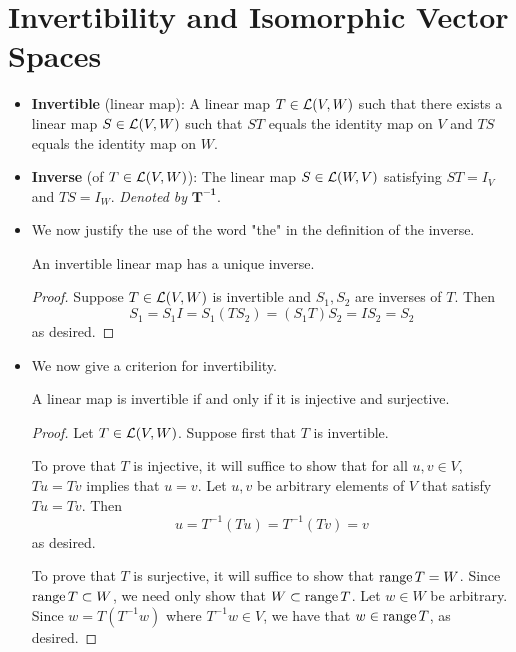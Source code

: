 \documentclass[../main.tex]{subfiles}
\begin{document}
\section{Invertibility and Isomorphic Vector Spaces}
\begin{itemize}
    \item {}\textbf{Invertible} (linear map): A linear map $T\in\mathcal{L}(V,W)$ such that there exists a linear map $S\in\mathcal{L}(V,W)$ such that $ST$ equals the identity map on $V$ and $TS$ equals the identity map on $W$.
    \item \textbf{Inverse} (of $T\in\mathcal{L}(V,W)$): The linear map $S\in\mathcal{L}(W,V)$ satisfying $ST=I_V$ and $TS=I_W$. \emph{Denoted by} $\bm{T^{-1}}$.
    \item We now justify the use of the word "the" in the definition of the inverse.
    \begin{theorem}\label{trm:uniqueInverse}
        An invertible linear map has a unique inverse.
        \begin{proof}
            Suppose $T\in\mathcal{L}(V,W)$ is invertible and $S_1,S_2$ are inverses of $T$. Then
            \begin{equation*}
                S_1 = S_1I = S_1(TS_2) = (S_1T)S_2 = IS_2 = S_2
            \end{equation*}
            as desired.
        \end{proof}
    \end{theorem}
    \item We now give a criterion for invertibility.
    \begin{theorem}\label{trm:invertibleInjectiveSurjective}
        A linear map is invertible if and only if it is injective and surjective.
        \begin{proof}
            Let $T\in\mathcal{L}(V,W)$. Suppose first that $T$ is invertible.\par
            To prove that $T$ is injective, it will suffice to show that for all $u,v\in V$, $Tu=Tv$ implies that $u=v$. Let $u,v$ be arbitrary elements of $V$ that satisfy $Tu=Tv$. Then
            \begin{equation*}
                u = T^{-1}(Tu) = T^{-1}(Tv) = v
            \end{equation*}
            as desired.\par
            To prove that $T$ is surjective, it will suffice to show that $\operatorname{range} T=W$. Since $\operatorname{range} T\subset W$, we need only show that $W\subset\operatorname{range} T$. Let $w\in W$ be arbitrary. Since $w=T(T^{-1}w)$ where $T^{-1}w\in V$, we have that $w\in\operatorname{range} T$, as desired.\par\smallskip

\end{proof}
\end{theorem}
\end{itemize}
\end{document}
